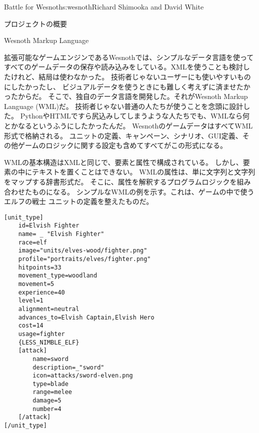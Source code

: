 \begin{aosachapter}{Battle for Wesnoth}{s:wesnoth}{Richard Shimooka and David White}
\begin{aosasect1}{プロジェクトの概要}
\end{aosasect1}

\begin{aosasect1}{Wesnoth Markup Language}

拡張可能なゲームエンジンであるWesnothでは、シンプルなデータ言語を使って
すべてのゲームデータの保存や読み込みをしている。XMLを使うことも検討したけれど、結局は使わなかった。
技術者じゃないユーザーにも使いやすいものにしたかったし、
ビジュアルデータを使うときにも難しく考えずに済ませたかったからだ。
そこで、独自のデータ言語を開発した。それがWesnoth Markup Language (WML)だ。
技術者じゃない普通の人たちが使うことを念頭に設計した。
PythonやHTMLですら尻込みしてしまうような人たちでも、WMLなら何とかなるというふうにしたかったんだ。
WesnothのゲームデータはすべてWML形式で格納される。
ユニットの定義、キャンペーン、シナリオ、GUI定義、その他ゲームのロジックに関する設定も含めてすべてがこの形式になる。

WMLの基本構造はXMLと同じで、要素と属性で構成されている。
しかし、要素の中にテキストを置くことはできない。
WMLの属性は、単に文字列と文字列をマップする辞書形式だ。
そこに、属性を解釈するプログラムロジックを組み合わせたものになる。
シンプルなWMLの例を示す。これは、ゲームの中で使うエルフの戦士
ユニットの定義を整えたものだ。

\begin{verbatim}
[unit_type]
    id=Elvish Fighter
    name= _ "Elvish Fighter"
    race=elf
    image="units/elves-wood/fighter.png"
    profile="portraits/elves/fighter.png"
    hitpoints=33
    movement_type=woodland
    movement=5
    experience=40
    level=1
    alignment=neutral
    advances_to=Elvish Captain,Elvish Hero
    cost=14
    usage=fighter
    {LESS_NIMBLE_ELF}
    [attack]
        name=sword
        description=_"sword"
        icon=attacks/sword-elven.png
        type=blade
        range=melee
        damage=5
        number=4
    [/attack]
[/unit_type]
\end{verbatim}


\end{aosasect1}
\end{aosachapter}
